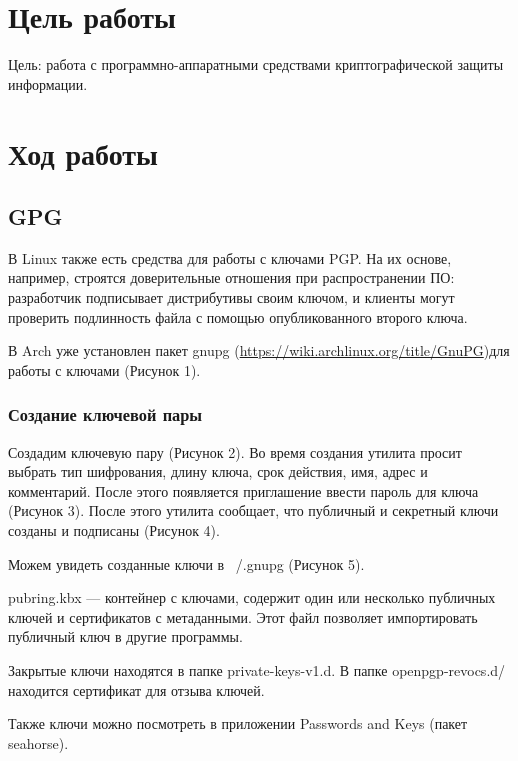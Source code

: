 \section{Цель работы}
Цель: работа с программно-аппаратными средствами криптографической защиты информации.

\section{Ход работы}
\subsection{GPG}

В Linux также есть средства для работы с ключами PGP. На их основе, например, строятся доверительные отношения при распространении ПО: разработчик подписывает дистрибутивы своим ключом, и клиенты могут проверить подлинность файла с помощью опубликованного второго ключа.

В Arch уже установлен пакет gnupg (\url{https://wiki.archlinux.org/title/GnuPG})для работы с ключами (Рисунок 1).

\FloatBarrier

\subsubsection{Создание ключевой пары}
Создадим ключевую пару (Рисунок 2). Во время создания утилита просит выбрать тип шифрования, длину ключа, срок действия, имя, адрес и комментарий. После этого появляется приглашение ввести пароль для ключа (Рисунок 3). После этого утилита сообщает, что публичный и секретный ключи созданы и подписаны (Рисунок 4).

\FloatBarrier

Можем увидеть созданные ключи в ~/.gnupg (Рисунок 5). 

pubring.kbx — контейнер с ключами, содержит один или несколько публичных ключей и сертификатов с метаданными. Этот файл позволяет импортировать публичный ключ в другие программы. 

Закрытые ключи находятся в папке private-keys-v1.d. В папке openpgp-revocs.d/ находится сертификат для отзыва ключей.

\FloatBarrier

Также ключи можно посмотреть в приложении Passwords and Keys (пакет \linebreak seahorse). 

